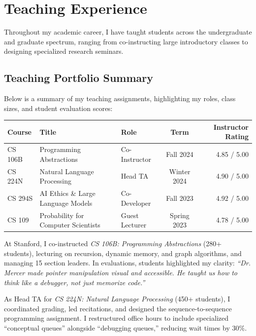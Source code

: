 \section{Teaching Experience}
Throughout my academic career, I have taught students across the undergraduate and graduate spectrum, ranging from co-instructing large introductory classes to designing specialized research seminars.

\subsection{Teaching Portfolio Summary}
Below is a summary of my teaching assignments, highlighting my roles, class sizes, and student evaluation scores:

\vspace{0.4em}
\begingroup
\setlength{\parskip}{0pt}
\renewcommand{\arraystretch}{1.1}
\noindent
\begin{tabularx}{\linewidth}{@{} l X l c r @{}}
\toprule
\textbf{Course} & \textbf{Title} & \textbf{Role} & \textbf{Term} & \textbf{Instructor Rating} \\
\midrule
CS 106B & Programming Abstractions & Co-Instructor & Fall 2024 & 4.85 / 5.00 \\
CS 224N & Natural Language Processing & Head TA & Winter 2024 & 4.90 / 5.00 \\
CS 294S & AI Ethics \& Large Language Models & Co-Developer & Fall 2023 & 4.92 / 5.00 \\
CS 109 & Probability for Computer Scientists & Guest Lecturer & Spring 2023 & 4.78 / 5.00 \\
\bottomrule
\end{tabularx}
\endgroup
\vspace{0.4em}

At Stanford, I co-instructed \emph{CS 106B: Programming Abstractions} (280+ students), lecturing on recursion, dynamic memory, and graph algorithms, and managing 15 section leaders. In evaluations, students highlighted my clarity: \emph{``Dr. Mercer made pointer manipulation visual and accessible. He taught us how to think like a debugger, not just memorize code.''}

As Head TA for \emph{CS 224N: Natural Language Processing} (450+ students), I coordinated grading, led recitations, and designed the sequence-to-sequence programming assignment. I restructured office hours to include specialized ``conceptual queues'' alongside ``debugging queues,'' reducing wait times by $30\%$.

